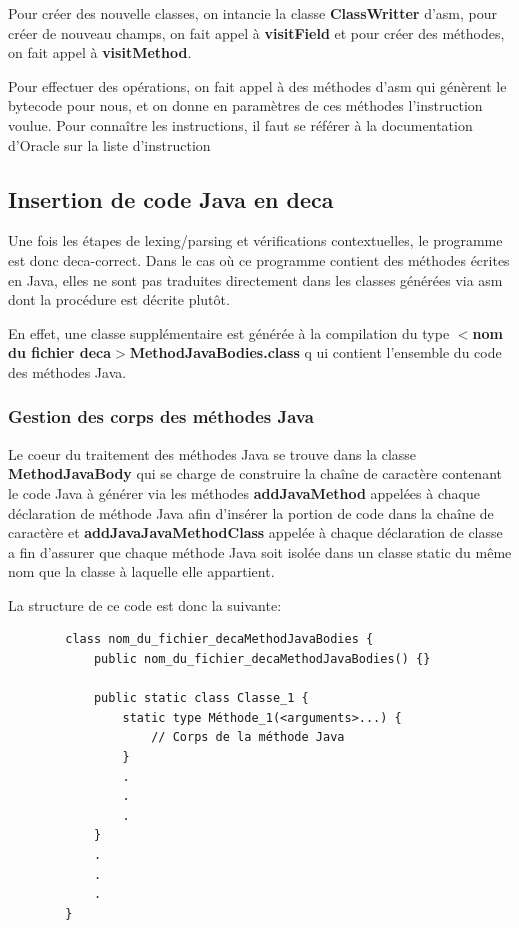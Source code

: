 \documentclass[12pt, a4paper, one side]{article}
\begin{document}
    Pour créer des nouvelle classes, on intancie la classe \textbf{ClassWritter}
    d'asm, pour créer de nouveau champs, on fait appel à \textbf{visitField} et
    pour créer des méthodes, on fait appel à \textbf{visitMethod}.

    Pour effectuer des opérations, on fait appel à des méthodes d'asm qui
    génèrent le bytecode pour nous, et on donne en paramètres de ces méthodes
    l'instruction voulue. Pour connaître les instructions, il faut se référer
    à la documentation d'Oracle sur la liste d'instruction \cite{ref_inst_java}

    \subsection{Insertion de code Java en deca}
    Une fois les étapes de lexing/parsing et vérifications contextuelles, le programme est
    donc deca-correct. Dans le cas où ce programme contient des méthodes écrites en Java, elles ne sont pas traduites
    directement dans les classes générées via asm dont la procédure est décrite plutôt.

    En effet, une classe supplémentaire est générée à la compilation du type \textbf{$<$nom du fichier deca$>$MethodJavaBodies.class} q
    ui contient l'ensemble du code des méthodes Java.

    \subsubsection{Gestion des corps des méthodes Java}
    Le coeur du traitement des méthodes Java se trouve dans la classe \textbf{MethodJavaBody} qui se charge de construire
    la chaîne de caractère contenant le code Java à générer via les méthodes \textbf{addJavaMethod} appelées à chaque déclaration de méthode
    Java afin d'insérer la portion de code dans la chaîne de caractère et \textbf{addJavaJavaMethodClass} appelée à chaque déclaration de classe a
    fin d'assurer que chaque méthode Java soit isolée dans un classe static du même nom que la classe à laquelle elle appartient.

    La structure de ce code est donc la suivante:

    \begin{verbatim}
        class nom_du_fichier_decaMethodJavaBodies {
            public nom_du_fichier_decaMethodJavaBodies() {}

            public static class Classe_1 {
                static type Méthode_1(<arguments>...) {
                    // Corps de la méthode Java
                }
                .
                .
                .
            }
            .
            .
            .
        }
    \end{verbatim}
\end{document}
